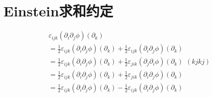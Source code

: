 
\section{Einstein求和约定}%
\begin{equation*}
	\begin{aligned}
		& \varepsilon_{ijk}(\partial_i \partial_j \phi)(\partial_k) \\
		&= 
		\frac{1}{2}\varepsilon_{ijk}(\partial_i \partial_j \phi)(\partial_k)
		+
		\frac{1}{2}\varepsilon_{ijk}(\partial_i \partial_j \phi)(\partial_k) \\
		&= 
		\frac{1}{2}\varepsilon_{ijk}(\partial_i \partial_j \phi)(\partial_k) 
		+
		\frac{1}{2}\varepsilon_{jik}(\partial_j \partial_i \phi)(\partial_k) \\
		&= 
		\frac{1}{2}\varepsilon_{ijk}(\partial_i \partial_j \phi)(\partial_k) 
		+
		\frac{1}{2}\varepsilon_{jik}(\partial_i \partial_j \phi)(\partial_k) \\
		&= 
		\frac{1}{2}\varepsilon_{ijk}(\partial_i \partial_j \phi)(\partial_k) 
		-
		\frac{1}{2}\varepsilon_{ijk}(\partial_i \partial_j \phi)(\partial_k)
	\end{aligned}
	\left( kjkj \right)
\end{equation*}





